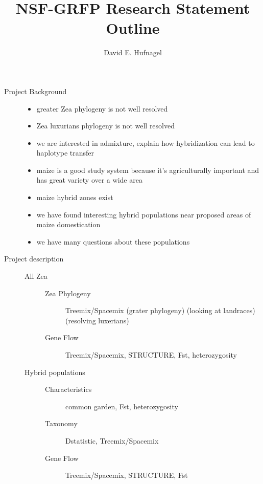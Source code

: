 \documentclass[11pt]{amsart}
\title{NSF-GRFP Research Statement Outline}
\author{David E. Hufnagel}
\begin{document}
\maketitle

\begin{description}
	\item[Project Background] \hfill
		\begin{itemize}
			\item greater Zea phylogeny is not well resolved
			\item Zea luxurians phylogeny is not well resolved
			\item we are interested in admixture, explain how hybridization can lead to haplotype transfer
			\item maize is a good study system because it's agriculturally important and has great variety over a wide area
			\item maize hybrid zones exist
			\item we have found interesting hybrid populations near proposed areas of maize domestication
			\item we have many questions about these populations
		\end{itemize}
	\item[Project description] \hfill
		\begin{description}
			\item[All Zea] \hfill
				\begin{description}
					\item[Zea Phylogeny] Treemix/Spacemix (grater phylogeny) (looking at landraces) (resolving luxerians)
					\item[Gene Flow] Treemix/Spacemix, STRUCTURE, Fst, heterozygosity
				\end{description}
			\item[Hybrid populations] \hfill
				\begin{description}
					\item[Characteristics] common garden, Fst, heterozygosity
					\item[Taxonomy] Dstatistic, Treemix/Spacemix
					\item[Gene Flow] Treemix/Spacemix, STRUCTURE, Fst

\end{description}
\end{description}
\end{description}
\end{document}
